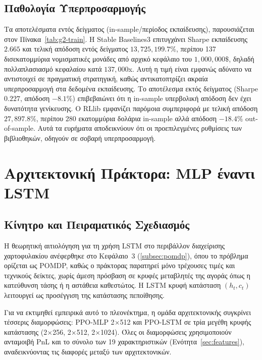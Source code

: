 \subsection{Παθολογία Υπερπροσαρμογής}
\label{subsec:exp-libraries-overfit}

Τα αποτελέσματα εντός δείγματος (in-sample/περίοδος εκπαίδευσης), παρουσιάζεται στον 
Πίνακα~\ref{tab:g2-train}. 
Η Stable Baselines3 επιτυγχάνει Sharpe εκπαίδευσης $2{.}665$ και τελική απόδοση 
εντός δείγματος $13{,}725{,}199{.}7\%$, περίπου 137 δισεκατομμύρια νομισματικές μονάδες από αρχικό 
κεφάλαιο του $1{,}000{,}000\$$, δηλαδή πολλαπλασιασμό κεφαλαίου κατά $137{,}000$x. 
Αυτή η τιμή είναι εμφανώς αδύνατο να αντιστοιχεί σε πραγματική στρατηγική, 
καθώς αντικατοπτρίζει ακραία υπερπροσαρμογή στα δεδομένα εκπαίδευσης. Το 
αποτέλεσμα εκτός δείγματος (Sharpe $0{.}227$, απόδοση $-8{.}1\%$) επιβεβαιώνει 
ότι η in-sample υπερβολική απόδοση δεν έχει δυνατότητα γενίκευσης. Ο RLlib εμφανίζει παρόμοια 
συμπεριφορά με τελική απόδοση $27{,}897{.}8\%$, περίπου $280$ εκατομμύρια δολάρια in-sample αλλά απόδοση $-18{.}4\%$ out-of-sample. 
Αυτά τα ευρήματα αποδεικνύουν ότι οι προεπιλεγμένες ρυθμίσεις των βιβλιοθηκών, 
οδηγούν σε σοβαρή υπερπροσαρμογή. 

\section{Αρχιτεκτονική Πράκτορα: MLP έναντι LSTM}
\label{sec:exp-arch}

\subsection{Κίνητρο και Πειραματικός Σχεδιασμός}
\label{subsec:exp-arch-design}

Η θεωρητική αιτιολόγηση για τη χρήση LSTM στο περιβάλλον διαχείρισης χαρτοφυλακίου ανέφερθηκε 
στο Κεφάλαιο~3 (\ref{subsec:pomdp}), όπου το πρόβλημα ορίζεται ως POMDP, καθώς ο πράκτορας παρατηρεί 
μόνο τρέχουσες τιμές και τεχνικούς δείκτες, χωρίς άμεση πρόσβαση σε κρυφές μεταβλητές της αγοράς 
όπως η κατεύθυνση τάσης ή η αστάθεια καθεστώτος. Η LSTM κρυφή κατάσταση $(h_t, c_t)$ λειτουργεί 
ως προσέγγιση της κατάστασης πεποίθησης.

Για να εκτιμηθεί εμπειρικά αυτό το πλεονέκτημα, η ομάδα αρχιτεκτονικής συγκρίνει 
τέσσερις διαμορφώσεις: PPO-MLP 2$\times$512 και PPO-LSTM σε τρία μεγέθη κρυφής 
κατάστασης (2$\times$256, 2$\times$512, 2$\times$1024). Όλες οι διαμορφώσεις 
χρησιμοποιούν ανταμοιβή PnL και το σύνολο των 19 χαρακτηριστικών (Ενότητα~\ref{sec:features}), 
αναδεικνύοντας τις διαφορές μεταξύ των αρχιτεκτονικών.

